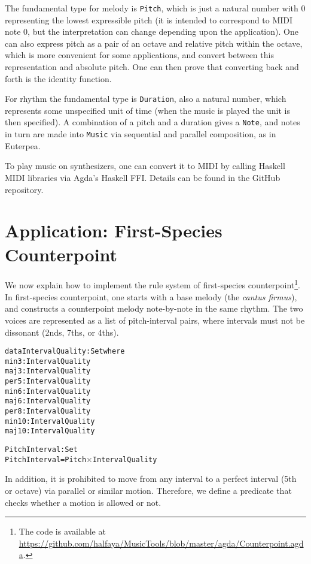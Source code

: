 \documentclass[sigplan,screen]{acmart}
\begin{document}
The fundamental type for melody is \texttt{Pitch}, which is just a natural number with $0$
representing the lowest expressible pitch (it is intended to correspond to MIDI note 0, but
the interpretation can change depending upon the application). One can also
express pitch as a pair of an octave and relative pitch within the octave, which is
more convenient for some applications, and convert between this representation and
absolute pitch. One can then prove that converting back and forth is the identity function.

For rhythm the fundamental type is \texttt{Duration}, also a natural number, which represents
some unspecified unit of time (when the music is played the unit is then specified).
A combination of a pitch and a duration gives a \texttt{Note}, and notes in turn are
made into \texttt{Music} via sequential and parallel composition, as in Euterpea.

To play music on synthesizers, one can convert it to MIDI by calling 
Haskell MIDI libraries via Agda's Haskell FFI. 
Details can be found in the GitHub repository.

\section{Application: First-Species Counterpoint}

We now explain how to implement the rule system of 
first-species counterpoint\footnote{The code is available at \\
\url{https://github.com/halfaya/MusicTools/blob/master/agda/Counterpoint.agda}.}.
In first-species counterpoint, one starts with a base melody 
(the \emph{cantus firmus}), and constructs a counterpoint 
melody note-by-note in the same rhythm.
The two voices are represented as a list of pitch-interval pairs,
where intervals must not be dissonant (2nds, 7ths, or 4ths).

\begin{alltt}
data IntervalQuality : Set where
  min3  : IntervalQuality
  maj3  : IntervalQuality
  per5  : IntervalQuality
  min6  : IntervalQuality
  maj6  : IntervalQuality
  per8  : IntervalQuality
  min10 : IntervalQuality
  maj10 : IntervalQuality

PitchInterval : Set
PitchInterval = Pitch \(\times\) IntervalQuality
\end{alltt}

In addition, it is prohibited to move from any interval to
a perfect interval (5th or octave) via parallel or similar motion.
Therefore, we define a predicate that checks whether a motion 
is allowed or not.
\end{document}
